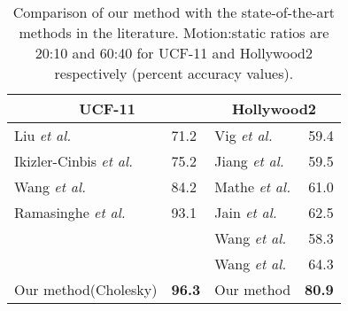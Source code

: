\begin{table}[]
\centering
\caption{Comparison of our method with the state-of-the-art methods in the literature. Motion:static ratios are 20:10 and 60:40 for
UCF-11 and Hollywood2 respectively (percent accuracy values).}\label{tbl:comparison}
\begin{tabular}{@{}lllr@{}}
\toprule
\multicolumn{2}{c}{UCF-11}    & \multicolumn{2}{c}{Hollywood2} \\ \midrule
Liu \textit{et al.}\cite{liu2009recognizing}            & 71.2  & Vig \textit{et al.}\cite{vig2012space}           & 59.4      \\
Ikizler-Cinbis \textit{et al.}\cite{ikizler2010object} & 75.2 & Jiang \textit{et al.}\cite{jiang2012trajectory}      & 59.5      \\
Wang \textit{et al.}\cite{wang2011action}    & 84.2  & Mathe \textit{et al.}\cite{mathe2012dynamic}         & 61.0      \\
Ramasinghe \textit{et al.}\cite{7486474}         & 93.1        & Jain \textit{et al.}\cite{jain2013better}           & 62.5      \\
                      &         & Wang \textit{et al.}\cite{wang2011action}             & 58.3      \\
                      &         & Wang \textit{et al.}\cite{wang2013action}          & 64.3      \\ \midrule
Our method(Cholesky)  & \textbf{96.3}       & Our method        &        \textbf{80.9}       \\ \bottomrule

\end{tabular}

\end{table}



